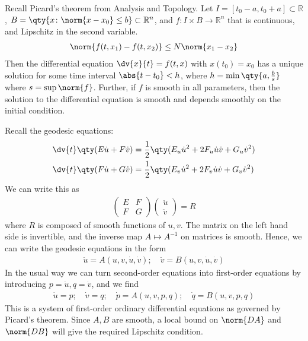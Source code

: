 Recall Picard's theorem from Analysis and Topology.
Let $I = [t_0 - a, t_0 + a] \subset \mathbb R$, $B = \qty{x \colon \norm{x-x_0} \leq b} \subset \mathbb R^n$, and $f \colon I \times B \to \mathbb R^n$ that is continuous, and Lipschitz in the second variable.
\begin{align*}
	\norm{f(t,x_1) - f(t,x_2)} \leq N \norm{x_1-x_2}
\end{align*}
Then the differential equation $\dv{x}{t} = f(t,x)$ with $x(t_0) = x_0$ has a unique solution for some time interval $\abs{t-t_0} < h$, where $h = \min\qty{a,\frac{b}{s}}$ where $s = \sup \norm{f}$.
Further, if $f$ is smooth in all parameters, then the solution to the differential equation is smooth and depends smoothly on the initial condition.

Recall the geodesic equations:
\begin{align*}
	\dv{t} \qty(E \dot u + F \dot v) & = \frac{1}{2} \qty( E_u \dot u^2 + 2F_u \dot u \dot v + G_u \dot v^2 ) \\
	\dv{t} \qty(F \dot u + G \dot v) & = \frac{1}{2} \qty( E_v \dot u^2 + 2F_v \dot u \dot v + G_v \dot v^2 )
\end{align*}
We can write this as
\begin{align*}
	\begin{pmatrix}
		E & F \\
		F & G
	\end{pmatrix} \begin{pmatrix}
		\ddot u \\
		\ddot v
	\end{pmatrix}= R
\end{align*}
where $R$ is composed of smooth functions of $u,v$.
The matrix on the left hand side is invertible, and the inverse map $A \mapsto A^{-1}$ on matrices is smooth.
Hence, we can write the geodesic equations in the form
\begin{align*}
	\ddot u = A(u, v, \dot u, \dot v);\quad \ddot v = B(u, v, \dot u, \dot v)
\end{align*}
In the usual way we can turn second-order equations into first-order equations by introducing $p = \dot u, q = \dot v$, and we find
\begin{align*}
	\dot u = p;\quad \dot v = q;\quad \dot p = A(u,v,p,q);\quad \dot q = B(u,v,p,q)
\end{align*}
This is a system of first-order ordinary differential equations as governed by Picard's theorem.
Since $A, B$ are smooth, a local bound on $\norm{DA}$ and $\norm{DB}$ will give the required Lipschitz condition.
